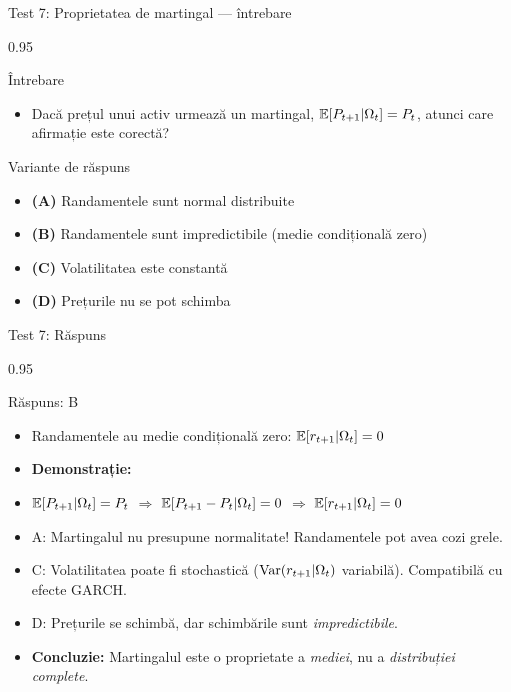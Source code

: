 \documentclass[9pt, aspectratio=169, t]{beamer}
\begin{document}
\begin{frame}[shrink=15]{Test 7: Proprietatea de martingal --- întrebare}
\begin{cminipage}{0.95\textwidth}
\begin{alertblock}{Întrebare}
\begin{itemize}\setlength{\itemsep}{0pt}
    \item Dacă prețul unui activ urmează un martingal, $\mathbb{E}[P_{t+1}|\Omega_t] = P_t$, atunci care afirmație este corectă?
\end{itemize}
\end{alertblock}

\vspace{0.4cm}
\begin{block}{Variante de răspuns}
\begin{itemize}\setlength{\itemsep}{2pt}
    \item \textcolor{MainBlue}{\textbf{(A)}} Randamentele sunt normal distribuite
    \item \textcolor{MainBlue}{\textbf{(B)}} Randamentele sunt impredictibile (medie condițională zero)
    \item \textcolor{MainBlue}{\textbf{(C)}} Volatilitatea este constantă
    \item \textcolor{MainBlue}{\textbf{(D)}} Prețurile nu se pot schimba
\end{itemize}
\end{block}
\end{cminipage}
\end{frame}

\begin{frame}[shrink=15]{Test 7: Răspuns}
\begin{cminipage}{0.95\textwidth}
\begin{exampleblock}{Răspuns: B}
\begin{itemize}\setlength{\itemsep}{0pt}
    \item Randamentele au medie condițională zero: $\mathbb{E}[r_{t+1}|\Omega_t] = 0$
\end{itemize}
\end{exampleblock}

\vspace{0.2cm}
\begin{itemize}\setlength{\itemsep}{0pt}
    \item \textbf{Demonstrație:}
    \item $\mathbb{E}[P_{t+1}|\Omega_t] = P_t$ $\Rightarrow$ $\mathbb{E}[P_{t+1} - P_t|\Omega_t] = 0$ $\Rightarrow$ $\mathbb{E}[r_{t+1}|\Omega_t] = 0$
    \item A: \incorrect{} Martingalul nu presupune normalitate! Randamentele pot avea cozi grele.
    \item C: \incorrect{} Volatilitatea poate fi stochastică ($\text{Var}(r_{t+1}|\Omega_t)$ variabilă). Compatibilă cu efecte GARCH.
    \item D: \incorrect{} Prețurile se schimbă, dar schimbările sunt \textit{impredictibile}.
    \item \textbf{Concluzie:} Martingalul este o proprietate a \textit{mediei}, nu a \textit{distribuției complete}.
\end{itemize}
\end{cminipage}
\end{frame}
\end{document}
